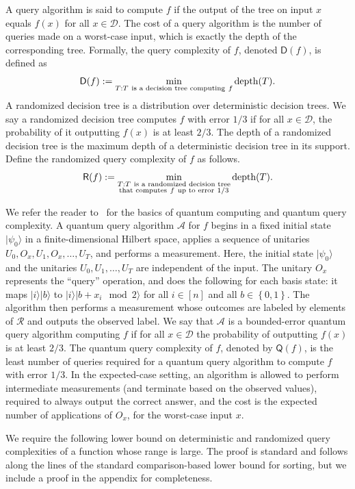 \documentclass[11pt]{article}
\newcommand{\ket}[1]{|#1\rangle}
\newcommand{\cD}{\mathcal{D}}
\newcommand{\cR}{\mathcal{R}}
\newcommand{\sD}{\mathsf{D}}
\newcommand{\sQ}{\mathsf{Q}}
\newcommand{\sR}{\mathsf{R}}
\newcommand{\set}[1]{\left\{ #1 \right\}}
\newcommand{\zone}{\set{0,1}}
\begin{document}
A query algorithm is said to compute $f$ if the output of the tree on input $x$ equals $f(x)$ for all $x \in \cD$.
The cost of a query algorithm is the number of queries made on a worst-case input, which is exactly the depth of the corresponding tree.
Formally, the query complexity of $f$, denoted $\sD(f)$, is defined as
\[
\sD(f) := \min_{T : T~\text{is a decision tree computing}~f} \textnormal{depth}(T).
\]
A randomized decision tree is a distribution over deterministic decision trees. We say a randomized decision tree computes $f$ with error $1/3$ if for all $x \in \cD$, the probability of it outputting $f(x)$ is at least $2/3$. The depth of a randomized decision tree is the maximum depth of a deterministic decision tree in its support.
Define the randomized query complexity of $f$ as follows.
\[
\sR(f) := \min_{\substack{T : T~\textnormal{is a randomized decision tree}\\\textnormal{that computes}~f~\textnormal{up to error}~1/3}}
\textnormal{depth}(T).
\]

We refer the reader to~\cite{BW02, NC16} for the basics of quantum computing and quantum query complexity. A quantum query algorithm $\mathcal{A}$ for $f$ begins in a fixed initial state $\ket{\psi_0}$ in a finite-dimensional Hilbert space, applies a sequence of unitaries $U_0, O_x, U_1, O_x, \dots, U_T$, and performs a measurement. Here, the initial state $\ket{\psi_0}$ and the unitaries $U_0, U_1, \dots, U_T$ are independent of the input. The unitary $O_x$ represents the ``query'' operation, and does the following for each basis state:
it maps $\ket{i}\ket{b}$ to $\ket{i}\ket{b + x_i \mod 2}$ for all $i \in [n]$ and all $b \in \zone$.
The algorithm then performs a measurement whose outcomes are labeled by elements of $\cR$ and outputs the observed label.
We say that $\mathcal{A}$ is a bounded-error quantum query algorithm computing $f$ if for all $x \in \cD$ the probability of outputting $f(x)$ is at least $2/3$. The quantum query complexity of $f$, denoted by $\sQ(f)$, is the least number of queries required for a quantum query algorithm to compute $f$ with error $1/3$. In the expected-case setting, an algorithm is allowed to perform intermediate measurements (and terminate based on the observed values), required to always output the correct answer, and the cost is the expected number of applications of $O_x$, for the worst-case input $x$. 

We require the following lower bound on deterministic and randomized query complexities of a function whose range is large.
The proof is standard and follows along the lines of the standard comparison-based lower bound for sorting, but we include a proof in the appendix for completeness.
\end{document}

